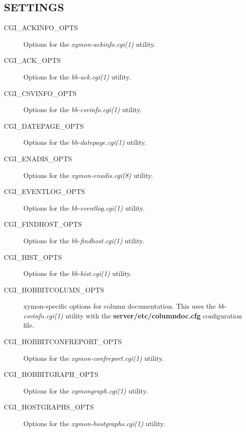  
\subsection{SETTINGS}
\begin{description}
\item[CGI\_ACKINFO\_OPTS] Options for the \emph{xymon-ackinfo.cgi(1)}
 utility. 

 

\item[CGI\_ACK\_OPTS] Options for the \emph{bb-ack.cgi(1)}
 utility. 

 

\item[CGI\_CSVINFO\_OPTS] Options for the \emph{bb-csvinfo.cgi(1)}
 utility. 

 

\item[CGI\_DATEPAGE\_OPTS] Options for the \emph{bb-datepage.cgi(1)}
 utility. 

 

\item[CGI\_ENADIS\_OPTS] Options for the \emph{xymon-enadis.cgi(8)}
 utility. 

 

\item[CGI\_EVENTLOG\_OPTS] Options for the \emph{bb-eventlog.cgi(1)}
 utility. 

 

\item[CGI\_FINDHOST\_OPTS] Options for the \emph{bb-findhost.cgi(1)}
 utility. 

 

\item[CGI\_HIST\_OPTS] Options for the \emph{bb-hist.cgi(1)}
 utility. 

 

\item[CGI\_HOBBITCOLUMN\_OPTS] xymon-specific options for column documentation. This uses the \emph{bb-csvinfo.cgi(1)}
 utility with the \textbf{server/etc/columndoc.cfg}
 configuration file. 

 

\item[CGI\_HOBBITCONFREPORT\_OPTS] Options for the \emph{xymon-confreport.cgi(1)}
 utility. 

 

\item[CGI\_HOBBITGRAPH\_OPTS] Options for the \emph{xymongraph.cgi(1)}
 utility. 

 

\item[CGI\_HOSTGRAPHS\_OPTS] Options for the \emph{xymon-hostgraphs.cgi(1)}
 utility. 


\end{description}
